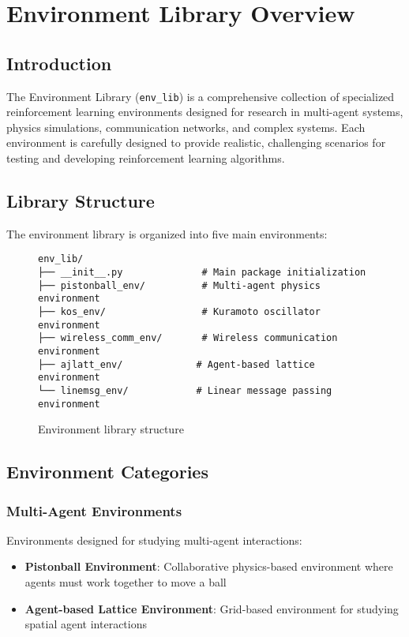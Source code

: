 \chapter{Environment Library Overview}

\section{Introduction}

The Environment Library (\texttt{env\_lib}) is a comprehensive collection of specialized reinforcement learning environments designed for research in multi-agent systems, physics simulations, communication networks, and complex systems. Each environment is carefully designed to provide realistic, challenging scenarios for testing and developing reinforcement learning algorithms.

\section{Library Structure}

The environment library is organized into five main environments:

\begin{figure}[H]
\centering
\begin{verbatim}
env_lib/
├── __init__.py              # Main package initialization
├── pistonball_env/          # Multi-agent physics environment
├── kos_env/                 # Kuramoto oscillator environment
├── wireless_comm_env/       # Wireless communication environment
├── ajlatt_env/             # Agent-based lattice environment
└── linemsg_env/            # Linear message passing environment
\end{verbatim}
\caption{Environment library structure}
\end{figure}

\section{Environment Categories}

\subsection{Multi-Agent Environments}

Environments designed for studying multi-agent interactions:

\begin{itemize}
    \item \textbf{Pistonball Environment}: Collaborative physics-based environment where agents must work together to move a ball
    \item \textbf{Agent-based Lattice Environment}: Grid-based environment for studying spatial agent interactions
\end{itemize}

